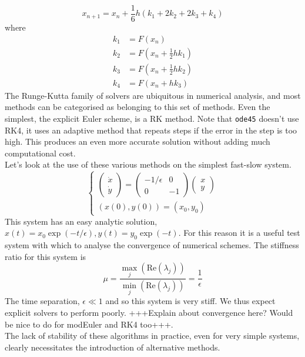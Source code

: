 $$ x_{n+1} = x_n +\frac{1}{6} h \left(k_1+2k_2+2k_3+k_4\right)$$
where
\begin{align*}
k_1 &= F(x_n)\\
k_2 &= F\left(x_n+\frac{1}{2}hk_1\right)\\
k_3 &= F\left(x_n +\frac{1}{2}hk_2\right)\\
k_4 &= F\left(x_n + hk_3\right)
\end{align*}
The Runge-Kutta family of solvers are ubiquitous in numerical analysis, and most methods can be categorised as belonging to this set of methods. Even the simplest, the explicit Euler scheme, is a RK method. Note that \texttt{ode45} doesn't use RK4, it uses an adaptive method that repeats steps if the error in the step is too high. This produces an even more accurate solution without adding much computational cost. \\

Let's look at the use of these various methods on the simplest fast-slow system.
		\begin{equation} \begin{cases}
		\begin{pmatrix} \dot{x}\\\dot{y}\end{pmatrix}=\begin{pmatrix}
		-1/\epsilon & 0 \\
		0& -1
		\end{pmatrix}\begin{pmatrix}
		x\\y 
		\end{pmatrix}\\
		(x(0),y(0))= (x_0,y_0)
		\end{cases}\label{eq:test}\end{equation}
This system has an easy analytic solution, $x(t) = x_0\exp(-t/\epsilon), y(t)=y_0 \exp(-t)$. For this reason it is a useful test system with which to analyse the convergence of numerical schemes. The stiffness ratio for this system is
$$ \mu =\frac{\max_j(\mathrm{Re}(\lambda_j))}{\min_j(\mathrm{Re}(\lambda_j))}= \frac{1}{\epsilon} $$
The time separation, $\epsilon \ll 1$ and so this system is very stiff. We thus expect explicit solvers to perform poorly. +++Explain about convergence here? Would be nice to do for modEuler and RK4 too+++.\\
The lack of stability of these algorithms in practice, even for very simple systems, clearly necessitates the introduction of alternative methods.

